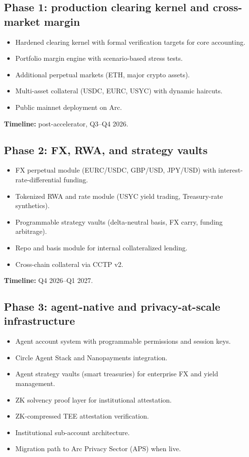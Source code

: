 \documentclass[11pt,a4paper]{article}
\begin{document}
\subsection{Phase 1: production clearing kernel and cross-market margin}

\begin{itemize}
  \item Hardened clearing kernel with formal verification targets for core accounting.
  \item Portfolio margin engine with scenario-based stress tests.
  \item Additional perpetual markets (ETH, major crypto assets).
  \item Multi-asset collateral (USDC, EURC, USYC) with dynamic haircuts.
  \item Public mainnet deployment on Arc.
\end{itemize}

\textbf{Timeline:} post-accelerator, Q3--Q4 2026.

\subsection{Phase 2: FX, RWA, and strategy vaults}

\begin{itemize}
  \item FX perpetual module (EURC/USDC, GBP/USD, JPY/USD) with interest-rate-differential funding.
  \item Tokenized RWA and rate module (USYC yield trading, Treasury-rate synthetics).
  \item Programmable strategy vaults (delta-neutral basis, FX carry, funding arbitrage).
  \item Repo and basis module for internal collateralized lending.
  \item Cross-chain collateral via CCTP v2.
\end{itemize}

\textbf{Timeline:} Q4 2026--Q1 2027.

\subsection{Phase 3: agent-native and privacy-at-scale infrastructure}

\begin{itemize}
  \item Agent account system with programmable permissions and session keys.
  \item Circle Agent Stack and Nanopayments integration.
  \item Agent strategy vaults (smart treasuries) for enterprise FX and yield management.
  \item ZK solvency proof layer for institutional attestation.
  \item ZK-compressed TEE attestation verification.
  \item Institutional sub-account architecture.
  \item Migration path to Arc Privacy Sector (APS) when live.
\end{itemize}
\end{document}
